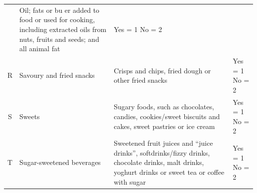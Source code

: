 \documentclass[12pt,]{book}
\theoremstyle{definition}
\theoremstyle{definition}
\theoremstyle{definition}
\theoremstyle{remark}
\begin{document}
\begin{longtable}[]{@{}clll@{}}
\begin{minipage}[t]{0.18\columnwidth}
\end{minipage} & \begin{minipage}[t]{0.54\columnwidth}\raggedright
Oil; fats or bu er added to food or used for cooking, including
extracted oils from nuts, fruits and seeds; and all animal fat\strut
\end{minipage} & \begin{minipage}[t]{0.12\columnwidth}\raggedright
Yes = 1 No = 2\strut
\end{minipage}\tabularnewline
\begin{minipage}[t]{0.05\columnwidth}\centering
R\strut
\end{minipage} & \begin{minipage}[t]{0.18\columnwidth}\raggedright
Savoury and fried snacks\strut
\end{minipage} & \begin{minipage}[t]{0.54\columnwidth}\raggedright
Crisps and chips, fried dough or other fried snacks\strut
\end{minipage} & \begin{minipage}[t]{0.12\columnwidth}\raggedright
Yes = 1 No = 2\strut
\end{minipage}\tabularnewline
\begin{minipage}[t]{0.05\columnwidth}\centering
S\strut
\end{minipage} & \begin{minipage}[t]{0.18\columnwidth}\raggedright
Sweets\strut
\end{minipage} & \begin{minipage}[t]{0.54\columnwidth}\raggedright
Sugary foods, such as chocolates, candies, cookies/sweet biscuits and
cakes, sweet pastries or ice cream\strut
\end{minipage} & \begin{minipage}[t]{0.12\columnwidth}\raggedright
Yes = 1 No = 2\strut
\end{minipage}\tabularnewline
\begin{minipage}[t]{0.05\columnwidth}\centering
T\strut
\end{minipage} & \begin{minipage}[t]{0.18\columnwidth}\raggedright
Sugar-sweetened beverages\strut
\end{minipage} & \begin{minipage}[t]{0.54\columnwidth}\raggedright
Sweetened fruit juices and ``juice drinks'', softdrinks/fizzy drinks,
chocolate drinks, malt drinks, yoghurt drinks or sweet tea or coffee
with sugar\strut
\end{minipage} & \begin{minipage}[t]{0.12\columnwidth}\raggedright
Yes = 1 No = 2\strut
\end{minipage}\tabularnewline
\bottomrule
\end{longtable}
\end{document}
